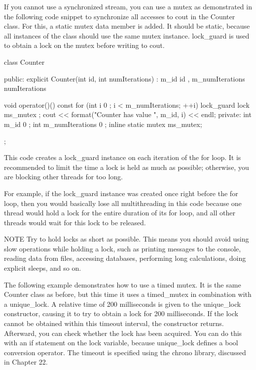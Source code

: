 
If you cannot use a synchronized stream, you can use a mutex as demonstrated in the following code snippet to synchronize all accesses to cout in the Counter class. For this, a static mutex data member is added. It should be static, because all instances of the class should use the same mutex instance. lock\_guard is used to obtain a lock on the mutex before writing to cout.

\begin{cpp}
class Counter
{
    public:
        explicit Counter(int id, int numIterations)
            : m_id { id }, m_numIterations { numIterations } { }

        void operator()() const
        {
            for (int i { 0 }; i < m_numIterations; ++i) {
                lock_guard lock { ms_mutex };
                cout << format("Counter {} has value {}", m_id, i) << endl;
            }
        }
    private:
        int m_id { 0 };
        int m_numIterations { 0 };
        inline static mutex ms_mutex;
};
\end{cpp}

This code creates a lock\_guard instance on each iteration of the for loop. It is recommended to limit the time a lock is held as much as possible; otherwise, you are blocking other threads for too long.

For example, if the lock\_guard instance was created once right before the for loop, then you would basically lose all multithreading in this code because one thread would hold a lock for the entire duration of its for loop, and all other threads would wait for this lock to be released.

\begin{myNotic}{NOTE}
Try to hold locks as short as possible. This means you should avoid using slow operations while holding a lock, such as printing messages to the console, reading data from files, accessing databases, performing long calculations, doing explicit sleeps, and so on.
\end{myNotic}


The following example demonstrates how to use a timed mutex. It is the same Counter class as before, but this time it uses a timed\_mutex in combination with a unique\_lock. A relative time of 200 milliseconds is given to the unique\_lock constructor, causing it to try to obtain a lock for 200 milliseconds. If the lock cannot be obtained within this timeout interval, the constructor returns. Afterward, you can check whether the lock has been acquired. You can do this with an if statement on the lock variable, because unique\_lock defines a bool conversion operator. The timeout is specified using the chrono library, discussed in Chapter 22.


